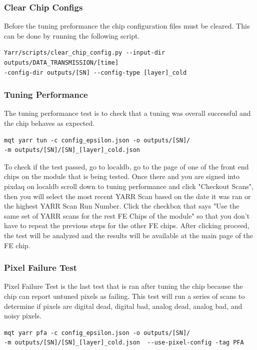 \documentclass[12pt]{article}
\begin{document}
\subsubsection{Clear Chip Configs}

Before the tuning preformance the chip configuration files must be cleared. This can be done by running the following script. 

\begin{verbatim}
Yarr/scripts/clear_chip_config.py --input-dir outputs/DATA_TRANSMISSION/[time] 
-config-dir outputs/[SN] --config-type [layer]_cold
\end{verbatim}

\subsubsection{Tuning Performance}

The tuning performance test is to check that a tuning was overall successful and the chip behaves as expected.

\begin{verbatim}
mqt yarr tun -c config_epsilon.json -o outputs/[SN]/
-m outputs/[SN]/[SN]_[layer]_cold.json 
\end{verbatim}

To check if the test passed, go to localdb, go to the page of one of the front end chips on the module that is being tested. Once there and you are signed into pixdaq on localdb scroll down to tuning performance and click "Checkout Scans", then you will select the most recent YARR Scan based on the date it was ran or the highest YARR Scan Run Number. Click the checkbox that says "Use the same set of YARR scans for the rest FE Chips of the module" so that you don't have to repeat the previous steps for the other FE chips. After clicking proceed, the test will be analyzed and the results will be available at the main page of the FE chip. 

\subsubsection{Pixel Failure Test}

Pixel Failure Test is the last test that is ran after tuning the chip because the chip can report untuned pixels as failing. This test will run a series of scans to determine if pixels are digital dead, digital bad, analog dead, analog bad, and noisy pixels.

\begin{verbatim}
mqt yarr pfa -c config_epsilon.json -o outputs/[SN]/
-m outputs/[SN]/[SN]_[layer]_cold.json  --use-pixel-config -tag PFA 
\end{verbatim}
\end{document}
